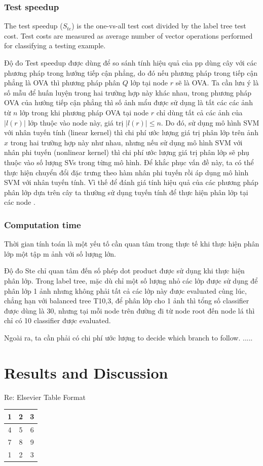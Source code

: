 \documentclass[preprint]{elsarticle}
\begin{document}
\subsubsection{Test speedup} 
The test speedup ($S_{te}$) is the one-vs-all test cost divided by the label tree test cost. Test costs are measured as average number of vector operations performed for classifying a testing example.
   

Độ đo Test speedup  được dùng để so sánh tính hiệu quả của pp dùng cây với các phương pháp trong hướng tiếp cận phẳng, do đó nếu phương pháp trong tiếp cận phẳng là OVA thì phương pháp phân $Q$ lớp tại node $r$ sẽ là OVA. Ta cần lưu ý là số mẫu để huấn luyện trong hai trường hợp này khác nhau, trong phương pháp OVA của hướng tiếp cận phẳng thì số ảnh mẩu được sử dụng là tất các các ảnh từ $n$ lớp trong khi phương pháp OVA tại node $r$ chỉ dùng tất cả các ảnh của $|l(r)|$ lớp thuộc vào node này, giá trị $|l(r)| \le  n$. Do đó, sử dụng mô hình SVM với nhân tuyến tính (linear kernel) thì chi phí ước lượng giá trị phân lớp trên ảnh $x$ trong hai trường hợp này như nhau, nhưng nếu sử dụng mô hình SVM với nhân phi tuyến (nonlinear kernel) thì chi phí ước lượng giá trị phân lớp sẽ phụ thuộc vào số lượng SVs trong từng mô hình. Để khắc phục vấn đề này, ta có thể thực hiện chuyển đổi đặc trưng theo hàm nhân phi tuyến rồi áp dụng mô hình SVM với nhân tuyến tính. Vì thế để đánh giá tính hiệu quả của các phương pháp phân lớp dựa trên cây ta thường sử dụng tuyến tính để thực hiện phân lớp tại các node \cite{Gao.ICCV2011}. 


\subsubsection{Computation time}

Thời gian tính toán  là một yếu tố cần quan tâm trong thực tế khi thực hiện phân lớp một tập m ảnh với số lượng lớn.

Độ đo Ste chỉ quan tâm đến số phép dot product được sử dụng khi thực hiện phân lớp. Trong label tree, mặc dù chỉ một số lượng nhỏ các lớp được sử dụng để phân lớp 1 ảnh nhưng không phải tất cả các lớp này được evaluated cùng lúc, chẳng hạn với balanced tree T10,3, để phân lớp cho 1 ảnh thì tổng số classifier được dùng là 30, nhưng tại mỗi node trên đường đi từ node root đến node lá thì chỉ có 10 classifier được evaluated. 

Ngoài ra, ta cần phải có chi phí ước lượng to decide which branch to follow. .....

\section{Results and Discussion}
Re: Elsevier Table Format
\begin{tabular}{ccc}
  \toprule
  1 & 2 & 3 \\
  \midrule
  4 & 5 & 6 \\
  7 & 8 & 9 \\
  1 & 2 & 3 \\
\end{tabular} 
\end{document}
